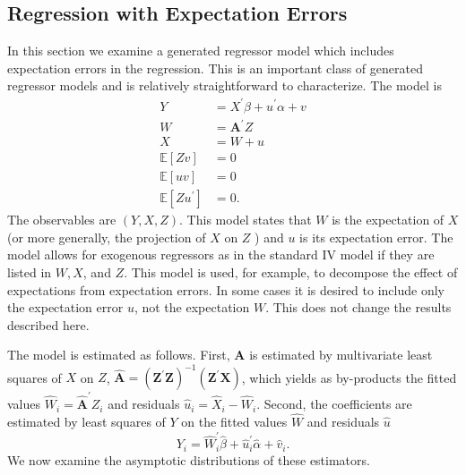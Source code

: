 \documentclass[10pt]{article}
\begin{document}
\subsection{Regression with Expectation Errors}
In this section we examine a generated regressor model which includes expectation errors in the regression. This is an important class of generated regressor models and is relatively straightforward to characterize. The model is
$$
\begin{aligned}
Y &=X^{\prime} \beta+u^{\prime} \alpha+v \\
W &=\boldsymbol{A}^{\prime} Z \\
X &=W+u \\
\mathbb{E}[Z v] &=0 \\
\mathbb{E}[u v] &=0 \\
\mathbb{E}\left[Z u^{\prime}\right] &=0 .
\end{aligned}
$$
The observables are $(Y, X, Z)$. This model states that $W$ is the expectation of $X$ (or more generally, the projection of $X$ on $Z$ ) and $u$ is its expectation error. The model allows for exogenous regressors as in the standard IV model if they are listed in $W, X$, and $Z$. This model is used, for example, to decompose the effect of expectations from expectation errors. In some cases it is desired to include only the expectation error $u$, not the expectation $W$. This does not change the results described here.

The model is estimated as follows. First, $\boldsymbol{A}$ is estimated by multivariate least squares of $X$ on $Z$, $\widehat{\boldsymbol{A}}=\left(\boldsymbol{Z}^{\prime} \boldsymbol{Z}\right)^{-1}\left(\boldsymbol{Z}^{\prime} \boldsymbol{X}\right)$, which yields as by-products the fitted values $\widehat{W}_{i}=\widehat{\boldsymbol{A}}^{\prime} Z_{i}$ and residuals $\widehat{u}_{i}=\widehat{X}_{i}-\widehat{W}_{i}$. Second, the coefficients are estimated by least squares of $Y$ on the fitted values $\widehat{W}$ and residuals $\widehat{u}$
$$
Y_{i}=\widehat{W}_{i}^{\prime} \widehat{\beta}+\widehat{u}_{i}^{\prime} \widehat{\alpha}+\widehat{v}_{i} .
$$
We now examine the asymptotic distributions of these estimators.
\end{document}
